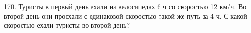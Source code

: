 170. Туристы в первый день ехали на велосипедах 6 ч со скоростью 12 км/ч. Во второй день они проехали с одинаковой скоростью такой же путь за 4 ч. С какой скоростью ехали туристы во второй день?\\
